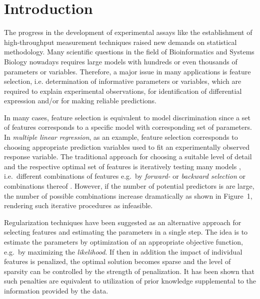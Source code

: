 \documentclass{bioinfo}
\begin{document}
\maketitle

\section{Introduction}
The progress in the development of experimental assays like the establishment of high-throughput measurement techniques raised new demands on statistical methodology. 
Many scientific questions in the field of Bioinformatics and Systems Biology nowadays requires large models with hundreds or even thousands of parameters or variables. 
Therefore, a major issue in many applications is feature selection, i.e. determination of informative parameters or variables, which are required to explain experimental observations, for identification of differential expression and/or for making reliable predictions. 

In many cases, feature selection is equivalent to model discrimination \citep{Box67} since a set of features corresponds to a specific model with corresponding set of parameters. 
In \emph{multiple linear regression}, as an example, feature selection corresponds to choosing appropriate prediction variables used to fit an experimentally observed response variable. 
The traditional approach for choosing a suitable level of detail and the respective optimal set of features is iteratively testing many models \citep{Thompson1978}, 
i.e.~different combinations of features e.g.~by \emph{forward-} or \emph{backward selection} or combinations thereof \citep{Hocking1967, Efroymson60}. 
However, if the number of potential predictors is are large, the number of possible combinations increase dramatically as shown in Figure~1\vphantom{\ref{fig:01}}, rendering such iterative procedures as infeasible. 

Regularization techniques have been suggested as an alternative approach for selecting features and estimating the parameters in a single step. 
The idea is to estimate the parameters by optimization of an appropriate objective function, e.g.~by maximizing the \emph{likelihood}. 
If then in addition the impact of individual features is penalized, the optimal solution becomes sparse and the level of sparsity can be controlled by the strength of penalization. 
It has been shown that such penalties are equivalent to utilization of prior knowledge supplemental to the information provided by the data. 
\end{document}
